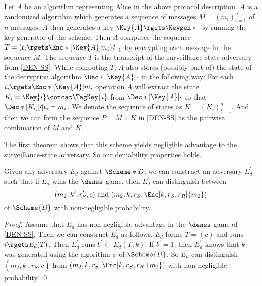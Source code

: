 Let \(A\) be an algorithm representing Alice in the above protocol description.
\(A\) is a randomized algorithm which generates a sequence of messages \(M 
  = ( m_i )_{i=1}^n\) of \(n\) messages.
\(A\) then generates a key \(\Key{A}\rgets \Keygen*{}\) by running the key 
generator of the scheme.
Then \(A\) computes the sequence \(T = ( t_i\rgets\Enc*[\Key{A}]{ m_i 
  } )_{i=1}^n\) by encrypting each message in the sequence \(M\).
The sequence \(T\) is the transcript of the surveillance-state adversary from 
\cref{DEN-SS}.
While computing \(T\), \(A\) also stores (possibly part of) the state of the 
decryption algorithm \(\Dec*[\Key{A}]{\cdot}\) in the following way:
For each \(t_i\rgets\Enc*[\Key{A}]{ m_i }\) operation \(A\) will extract the 
state \(K_i = \Key{i}\concat \TagKey{i}\) from \(\Dec*[\Key{A}]{\cdot}\) so 
that \(\Dec*[K_i][\prime]{t_i} = m_i\).
We denote the sequence of states as \(K = ( K_i )_{i=1}^{n}\).
And then we can form the sequence \(P = M\times K\) in \cref{DEN-SS} as the 
pairwise combination of \(M\) and \(K\).

The first theorem shows that this scheme yields negligible advantage to the 
surveillance-state adversary.
So our deniability properties holds.

\begin{theorem}
  Given any adversary \(E_d\) against \(\Scheme*{D}\), we can construct an 
  adversary \(E_d^\prime\) such that if \(E_d\) wins the \(\denss\) game, then 
  \(E_d^\prime\) can distinguish between \[
    ( m_2, k^\prime, r_S^\prime, c ) \text{ and }
    ( m_2, k, r_S, \Enc[k, r_S, r_R]{ m_2 } )
  \] of \(\Scheme{D}\) with non-negligible probability.
\end{theorem}
\begin{proof}
  Assume that \(E_d\) has non-negligible advantage in the \(\denss\) game of 
  \cref{DEN-SS}.
  Then we can construct \(E_d^\prime\) as follows.
  \(E_d^\prime\) forms \(T = ( c )\) and runs \(i\rgets E_d( T )\).
  Then \(E_d^\prime\) runs \(b^\prime\gets E_d( T, k )\).
  If \(b^\prime = 1\), then \(E_d^\prime\) knows that \(k\) was generated using 
  the algorithm \(\phi\) of \(\Scheme{D}\).
  So \(E_d^\prime\) can distinguish \(( m_2, k^\prime, r_S^\prime, c )\) from 
  \(( m_2, k, r_S, \Enc[k, r_S, r_R]{ m_2 } )\) with non-negligible 
  probability.
  \qed{}
\end{proof}

